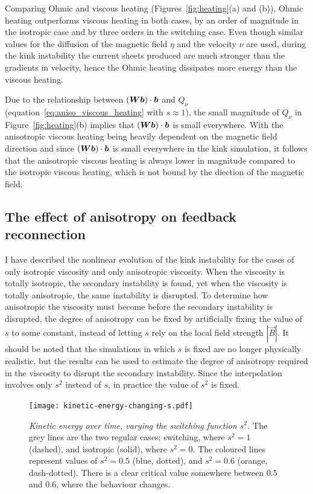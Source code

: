 Comparing Ohmic and viscous heating (Figures~\ref{fig:heating}(a) and (b)), Ohmic heating outperforms viscous heating in both cases, by an order of magnitude in the isotropic case and by three orders in the switching case. Even though similar values for the diffusion of the magnetic field $\eta$ and the velocity $\nu$ are used, during the kink instability the current sheets produced are much stronger than the gradients in velocity, hence the Ohmic heating dissipates more energy than the viscous heating.

Due to the relationship between $({\bm W} {\bm b}) \cdot {\bm b}$ and $Q_{\nu}$ (equation~\eqref{eq:aniso_viscous_heating} with $s\approx 1$), the small magnitude of $Q_{\nu}$ in Figure~\ref{fig:heating}(b) implies that $({\bm W} {\bm b}) \cdot {\bm b}$ is small everywhere. With the anisotropic viscous heating being heavily dependent on the magnetic field direction and since $({\bm W} {\bm b}) \cdot {\bm b}$ is small everywhere in the kink simulation, it follows that the anisotropic viscous heating is always lower in magnitude compared to the isotropic viscous heating, which is not bound by the diection of the magnetic field.

\subsection{The effect of anisotropy on feedback reconnection}

I have described the nonlinear evolution of the kink instability for the cases of only isotropic viscosity and only anisotropic viscosity. When the viscosity is totally isotropic, the secondary instability is found, yet when the viscosity is totally anisotropic, the same instability is disrupted. To determine how anisotropic the viscosity must become before the secondary instability is disrupted, the degree of anisotropy can be fixed by artificially fixing the value of $s$ to some constant, instead of letting $s$ rely on the local field strength $|\vec{B}|$. It should be noted that the simulations in which $s$ is fixed are no longer physically realistic, but the results can be used to estimate the degree of anisotropy required in the viscosity to disrupt the secondary instability. Since the interpolation involves only $s^2$ instead of $s$, in practice the value of $s^2$ is fixed.

\begin{figure}[t]
  \centering
  \texttt{[image: kinetic-energy-changing-s.pdf]}
  \caption{\textit{Kinetic energy over time, varying the switching
        function $s^2$.} The grey lines are the two regular cases; switching, where $s^2 = 1$ (dashed), and isotropic (solid), where $s^2=0$. The coloured lines represent values of $s^2 = 0.5$ (blue, dotted), and $s^2 = 0.6$ (orange, dash-dotted). There is a clear critical value somewhere between $0.5$ and $0.6$, where the behaviour changes.}
  \label{fig:kinetic-energy-changing-s}
\end{figure}

